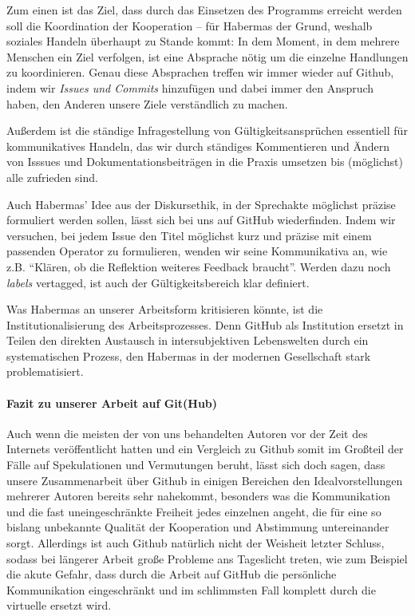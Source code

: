 Zum einen ist das Ziel, dass durch das Einsetzen des Programms erreicht werden soll die Koordination der Kooperation -- für Habermas der Grund, weshalb soziales Handeln überhaupt zu Stande kommt:
In dem Moment, in dem mehrere Menschen ein Ziel verfolgen, ist eine Absprache nötig um die einzelne Handlungen zu koordinieren.
Genau diese Absprachen treffen wir immer wieder auf Github, indem wir \emph{Issues und Commits} hinzufügen und dabei immer den Anspruch haben, den Anderen unsere Ziele verständlich zu machen.

Außerdem ist die ständige Infragestellung von Gültigkeitsansprüchen essentiell für kommunikatives Handeln, das wir durch ständiges Kommentieren und Ändern von Isssues und Dokumentationsbeiträgen in die Praxis umsetzen bis (möglichst) alle zufrieden sind.

Auch Habermas' Idee aus der Diskursethik, in der Sprechakte möglichst präzise formuliert werden sollen, lässt sich bei uns auf GitHub wiederfinden.
Indem wir versuchen, bei jedem Issue den Titel möglichst kurz und präzise mit einem passenden Operator zu formulieren, wenden wir seine Kommunikativa an, wie z.B. ``Klären, ob die Reflektion weiteres Feedback braucht''.
Werden dazu noch \emph{labels} vertagged, ist auch der Gültigkeitsbereich klar definiert.

Was Habermas an unserer Arbeitsform kritisieren könnte, ist die Institutionalisierung des Arbeitsprozesses.
Denn GitHub als Institution ersetzt in Teilen den direkten Austausch in intersubjektiven Lebenswelten durch ein systematischen Prozess, den Habermas in der modernen Gesellschaft stark problematisiert.


\paragraph{Fazit zu unserer Arbeit auf Git(Hub)}

Auch wenn die meisten der von uns behandelten Autoren vor der Zeit des Internets veröffentlicht hatten und ein Vergleich zu Github somit im Großteil der Fälle auf Spekulationen und Vermutungen beruht, lässt sich doch sagen, dass unsere Zusammenarbeit über Github in einigen Bereichen den Idealvorstellungen mehrerer Autoren bereits sehr nahekommt, besonders was die Kommunikation und die fast uneingeschränkte Freiheit jedes einzelnen angeht, die für eine so bislang unbekannte Qualität der Kooperation und Abstimmung untereinander sorgt.
Allerdings ist auch Github natürlich nicht der Weisheit letzter Schluss, sodass bei längerer Arbeit große Probleme ans Tageslicht treten, wie zum Beispiel die akute Gefahr, dass durch die Arbeit auf GitHub die persönliche Kommunikation eingeschränkt und im schlimmsten Fall komplett durch die virtuelle ersetzt wird.
